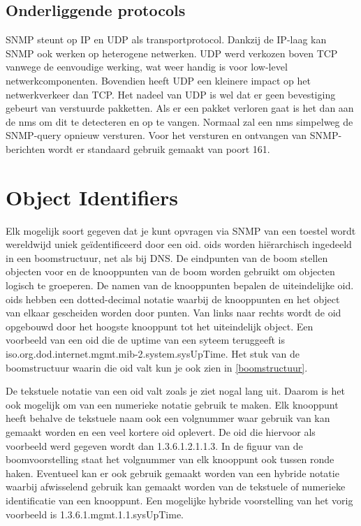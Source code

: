 \subsection{Onderliggende protocols}

SNMP steunt op IP en UDP als transportprotocol. Dankzij de IP-laag kan SNMP ook werken op heterogene netwerken.
UDP werd verkozen boven TCP vanwege de eenvoudige werking, wat weer handig is voor low-level netwerkcomponenten.
Bovendien heeft UDP een kleinere impact op het netwerkverkeer dan TCP\cite{moreau}.
Het nadeel van UDP is wel dat er geen bevestiging gebeurt van verstuurde pakketten.
Als er een pakket verloren gaat is het dan aan de \gls{nms} om dit te detecteren en op te vangen.
Normaal zal een \gls{nms} simpelweg de SNMP-query opnieuw versturen.
Voor het versturen en ontvangen van SNMP-berichten wordt er standaard gebruik gemaakt van poort 161.


\section{Object Identifiers}

Elk mogelijk soort gegeven dat je kunt opvragen via SNMP van een toestel wordt wereldwijd uniek geïdentificeerd\cite{moreau} door een \gls{oid}.
\glspl{oid} worden hiërarchisch ingedeeld in een boomstructuur, net als bij DNS. De eindpunten van de boom stellen objecten voor en de knooppunten van de boom
worden gebruikt om objecten logisch te groeperen. De namen van de knooppunten bepalen de uiteindelijke \gls{oid}.
\glspl{oid} hebben een dotted-decimal notatie waarbij de knooppunten en het object van elkaar gescheiden worden door punten. %
Van links naar rechts wordt de \gls{oid} opgebouwd door het hoogste knooppunt tot het uiteindelijk object.
Een voorbeeld van een \gls{oid} die de uptime van een syteem teruggeeft is iso.org.dod.internet.mgmt.mib-2.system.sysUpTime.
Het stuk van de boomstructuur waarin die \gls{oid} valt kun je ook zien in \cref{boomstructuur}.

De tekstuele notatie van een \gls{oid} valt zoals je ziet nogal lang uit.
Daarom is het ook mogelijk om van een numerieke notatie gebruik te maken.
Elk knooppunt heeft behalve de tekstuele naam ook een volgnummer waar gebruik van kan gemaakt worden en een veel kortere \gls{oid} oplevert.
De \gls{oid} die hiervoor als voorbeeld werd gegeven wordt dan 1.3.6.1.2.1.1.3.
In de figuur van de boomvoorstelling staat het volgnummer van elk knooppunt ook tussen ronde haken. Eventueel kan er ook gebruik gemaakt worden van een
hybride notatie waarbij afwisselend gebruik kan gemaakt worden van de tekstuele of numerieke identificatie van een knooppunt.
Een mogelijke hybride voorstelling van het vorig voorbeeld is 1.3.6.1.mgmt.1.1.sysUpTime.

